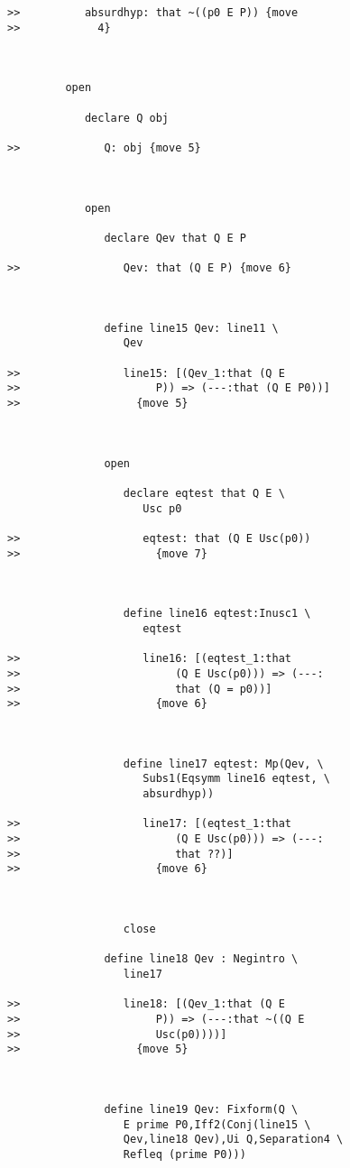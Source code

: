 \documentclass[12pt]{article}
\begin{document}
\begin{verbatim}
>>          absurdhyp: that ~((p0 E P)) {move
>>            4}



         open

            declare Q obj

>>             Q: obj {move 5}



            open

               declare Qev that Q E P

>>                Qev: that (Q E P) {move 6}



               define line15 Qev: line11 \
                  Qev

>>                line15: [(Qev_1:that (Q E
>>                     P)) => (---:that (Q E P0))]
>>                  {move 5}



               open

                  declare eqtest that Q E \
                     Usc p0

>>                   eqtest: that (Q E Usc(p0))
>>                     {move 7}



                  define line16 eqtest:Inusc1 \
                     eqtest

>>                   line16: [(eqtest_1:that
>>                        (Q E Usc(p0))) => (---:
>>                        that (Q = p0))]
>>                     {move 6}



                  define line17 eqtest: Mp(Qev, \
                     Subs1(Eqsymm line16 eqtest, \
                     absurdhyp))

>>                   line17: [(eqtest_1:that
>>                        (Q E Usc(p0))) => (---:
>>                        that ??)]
>>                     {move 6}



                  close

               define line18 Qev : Negintro \
                  line17

>>                line18: [(Qev_1:that (Q E
>>                     P)) => (---:that ~((Q E
>>                     Usc(p0))))]
>>                  {move 5}



               define line19 Qev: Fixform(Q \
                  E prime P0,Iff2(Conj(line15 \
                  Qev,line18 Qev),Ui Q,Separation4 \
                  Refleq (prime P0)))


\end{verbatim}
\end{document}
